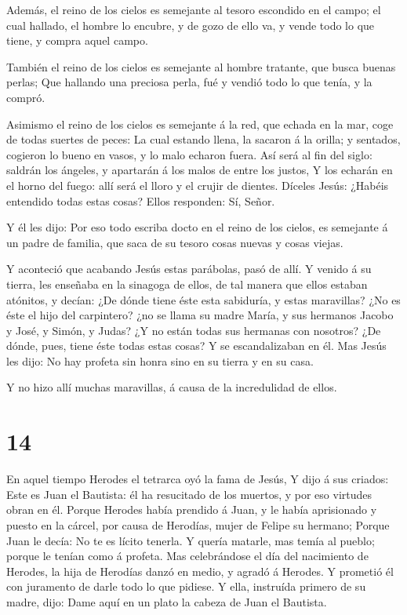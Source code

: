  Además, el reino de los cielos es semejante al tesoro
escondido en el campo; el cual hallado, el hombre lo encubre, y de gozo
de ello va, y vende todo lo que tiene, y compra aquel campo.

 También el reino de los cielos es semejante al hombre
tratante, que busca buenas perlas;  Que hallando una
preciosa perla, fué y vendió todo lo que tenía, y la compró.

 Asimismo el reino de los cielos es semejante á la red, que
echada en la mar, coge de todas suertes de peces:  La cual
estando llena, la sacaron á la orilla; y sentados, cogieron lo bueno en
vasos, y lo malo echaron fuera.  Así será al fin del siglo:
saldrán los ángeles, y apartarán á los malos de entre los justos,
 Y los echarán en el horno del fuego: allí será el lloro y
el crujir de dientes.  Díceles Jesús: ¿Habéis entendido
todas estas cosas? Ellos responden: Sí, Señor.

 Y él les dijo: Por eso todo escriba docto en el reino de
los cielos, es semejante á un padre de familia, que saca de su tesoro
cosas nuevas y cosas viejas.

 Y aconteció que acabando Jesús estas parábolas, pasó de
allí.  Y venido á su tierra, les enseñaba en la sinagoga de
ellos, de tal manera que ellos estaban atónitos, y decían: ¿De dónde
tiene éste esta sabiduría, y estas maravillas?  ¿No es éste
el hijo del carpintero? ¿no se llama su madre María, y sus hermanos
Jacobo y José, y Simón, y Judas?  ¿Y no están todas sus
hermanas con nosotros? ¿De dónde, pues, tiene éste todas estas cosas?
 Y se escandalizaban en él. Mas Jesús les dijo: No hay
profeta sin honra sino en su tierra y en su casa.

 Y no hizo allí muchas maravillas, á causa de la
incredulidad de ellos.

\hypertarget{section-13}{%
\section{14}\label{section-13}}

 En aquel tiempo Herodes el tetrarca oyó la fama de Jesús,
 Y dijo á sus criados: Este es Juan el Bautista: él ha
resucitado de los muertos, y por eso virtudes obran en él. 
Porque Herodes había prendido á Juan, y le había aprisionado y puesto en
la cárcel, por causa de Herodías, mujer de Felipe su hermano;
 Porque Juan le decía: No te es lícito tenerla. 
Y quería matarle, mas temía al pueblo; porque le tenían como á profeta.
 Mas celebrándose el día del nacimiento de Herodes, la hija
de Herodías danzó en medio, y agradó á Herodes.  Y prometió
él con juramento de darle todo lo que pidiese.  Y ella,
instruída primero de su madre, dijo: Dame aquí en un plato la cabeza de
Juan el Bautista.

